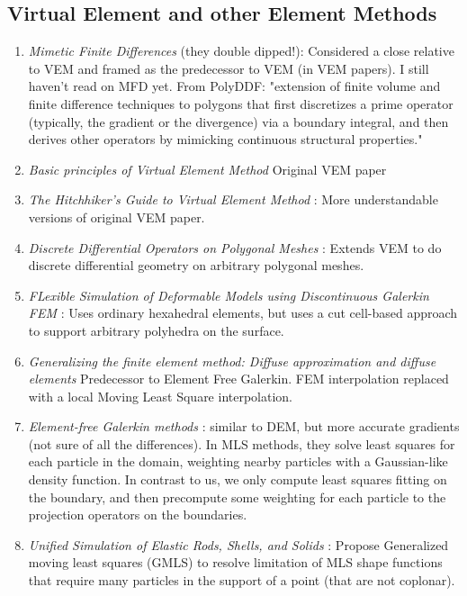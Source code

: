 \documentclass[sigconf]{acmart}
\begin{document}
\subsection{Virtual Element and other Element Methods}
\begin{enumerate}
    \item \textit{Mimetic Finite Differences} \cite{10.1142/S0218202505000832} \cite{10.1016/j.jcp.2013.07.031} (they double dipped!): Considered a close relative to VEM and framed as the predecessor to VEM (in VEM papers). I still haven't read on MFD yet. From PolyDDF: "extension of finite volume and finite difference techniques to polygons that first discretizes a prime operator (typically, the gradient or the divergence) via a boundary integral, and then derives other operators by mimicking continuous structural properties."
    \item \textit{Basic principles of Virtual Element Method} \cite{10.1142/S0218202512500492} Original VEM paper
    \item \textit{The Hitchhiker's Guide to Virtual Element Method} \cite{10.1142/S021820251440003X}: More understandable versions of original VEM paper.
    \item \textit{Discrete Differential Operators on Polygonal Meshes} \cite{10.1145/3386569.3392389}: Extends VEM to do discrete differential geometry on arbitrary polygonal meshes.
    \item \textit{FLexible Simulation of Deformable Models using Discontinuous Galerkin FEM} \cite{10.5555/1632592.1632608}: Uses ordinary hexahedral elements, but uses a cut cell-based approach to support arbitrary polyhedra on the surface. 
    \item \textit{Generalizing the finite element method: Diffuse approximation and diffuse elements} \cite{Nayroles1992GeneralizingTF} Predecessor to Element Free Galerkin. FEM interpolation replaced with a local Moving Least Square interpolation.
    \item \textit{Element-free Galerkin methods} \cite{https://doi.org/10.1002/nme.1620370205}: similar to DEM, but more accurate gradients (not sure of all the differences). In MLS methods, they solve least squares for each particle in the domain, weighting nearby particles with a Gaussian-like density function. In contrast to us, we only compute least squares fitting on the boundary, and then precompute some weighting for each particle to the projection operators on the boundaries.
    \item \textit{Unified Simulation of Elastic Rods, Shells, and Solids} \cite{10.1145/1778765.1778776}: Propose Generalized moving least squares (GMLS) to resolve limitation of MLS shape functions that require many particles in the support of a point (that are not coplonar).  
\end{enumerate}
\end{document}
